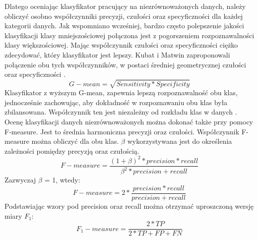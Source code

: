 Dlatego oceniając klasyfikator pracujący na niezrównoważonych danych, należy obliczyć osobno współczynniki precyzji, czułości oraz specyficzności dla każdej kategorii danych. Jak wspomniano wcześniej, bardzo często polepszenie jakości klasyfikacji klasy mniejszościowej połączona jest z pogorszeniem rozpoznawalności klasy większościowej. Mając współczynnik czułości oraz specyficzności ciężko zdecydować, który klasyfikator jest lepszy. Kubat i Matwin zaproponowali połączenie obu tych współczynników, w postaci średniej geometrycznej czułości oraz specyficzności \cite{KubatMatwin}. 
\[G-mean = \sqrt{Sensitivity*Specificity}\]
Klasyfikator z wyższym G-mean, zapewnia lepszą rozpoznawalność obu klas, jednocześnie zachowując, aby dokładność w rozpoznawaniu obu klas była zbilansowana. Współczynnik ten jest niezależny od rozkładu klas w danych \cite{Garcia}.
\\
Ocenę klasyfikacji danych niezrównoważonych można dokonać także przy pomocy F-measure. Jest to średnia harmoniczna precyzji oraz czułości. Współczynnik F-measure można obliczyć dla obu klas. $\beta$ wykorzystywana jest do określenia zależności pomiędzy precyzją oraz czułością.
\[F-measure= \frac{(1+\beta)^2*precision*recall}{\beta^2*precision+recall}\]
Zazwyczaj $\beta$ = 1, wtedy:
\[F-measure= 2*\frac{precision*recall}{precision+recall}\]
Podstawiając wzory pod precision oraz recall można otrzymać uproszczoną wersję miary $F_1$:
\[F_1-measure= \frac{2*TP}{2*TP+FP+FN}\]

